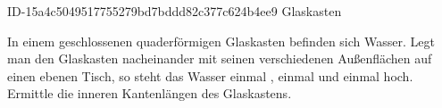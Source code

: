 \begin{exercise}
      {ID-15a4c5049517755279bd7bddd82c377c624b4ee9}
      {Glaskasten}
  \ifproblem\problem\par
    In einem geschlossenen quaderförmigen Glaskasten befinden sich 
    Wasser. Legt man den Glaskasten nacheinander mit seinen verschiedenen
    Außenflächen auf einen ebenen Tisch, so steht das Wasser einmal ,
    einmal  und einmal  hoch. Ermittle die inneren Kantenlängen
    des Glaskastens.
  \fi
\end{exercise}
